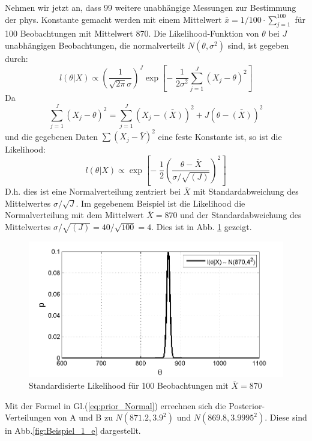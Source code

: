 Nehmen wir jetzt an, dass 99 weitere unabhängige Messungen zur Bestimmung der 
phys. Konstante gemacht werden mit einem Mittelwert $\bar{x} = 1/100 \cdot \sum_{j=1}^{100}$ für 100 Beobachtungen mit Mittelwert 870. Die Likelihood-Funktion von $\theta$ bei $J$ unabhängigen Beobachtungen, die normalverteilt $N(\theta, \sigma^2)$ sind, ist gegeben durch:
\[
l(\theta|X) \propto \left( \frac{1}{\sqrt{2\pi}\sigma}\right)^J 
\exp \left[-\; \frac{1}{2\sigma^2}\sum_{j=1}^{J}(X_j-\theta)^2\right] 
\]
Da 
\[
\sum_{j=1}^{J} (X_j-\theta)^2 = \sum_{j=1}^{J} (X_j-\bar{(X)})^2+J(\theta-\bar{(X)})^2
\]
und die gegebenen Daten $\sum(X_j-\bar{Y})^2$ eine feste Konstante ist, so ist
die Likelihood:
\begin{equation}
l(\theta|X) \propto 
\exp \left[-\; \frac{1}{2} \left(\frac{\theta-\bar{X}}{\sigma / \sqrt{(J)}}
\right)^2\right]
\label{eq:Likelihood_Stichprobenumfang_J} 
\end{equation}
D.h. dies ist eine Normalverteilung zentriert bei $\bar{X}$ mit Standardabweichung des Mittelwertes
$\sigma / \sqrt{J}$.
Im gegebenem Beispiel ist die Likelihood die Normalverteilung mit dem Mittelwert
$\bar{X} = 870$ und der Standardabweichung des Mittelwertes $\sigma/\sqrt{(J)} = 40 / \sqrt{100} = 4$.
Dies ist in Abb. \ref{fig:Beispiel_1_d} gezeigt.

\begin{figure}[!h]
	\begin{center}
		\includegraphics[width=130mm]{08_vorlesung/media/likelihood_100_Beobachtung.png}
		\caption{Standardisierte Likelihood
		für 100 Beobachtungen mit $\bar{X} = 870$}
	    \label{fig:Beispiel_1_d}
	\end{center}
\end{figure}

Mit der Formel in Gl.(\ref{eq:prior_Normal}) errechnen sich die Posterior-Verteilungen 
von A und B zu $N(871.2,3.9^2)$ und $N(869.8,3.9995^2)$.
Diese sind in Abb.\ref{fig:Beispiel_1_e} dargestellt. 

